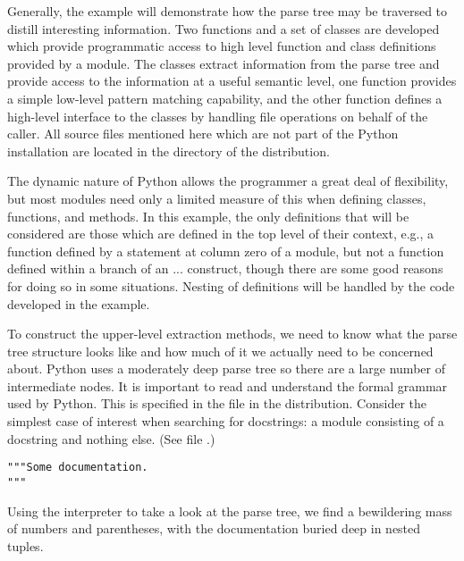 Generally, the example will demonstrate how the parse tree may be
traversed to distill interesting information.  Two functions and a set
of classes are developed which provide programmatic access to high
level function and class definitions provided by a module.  The
classes extract information from the parse tree and provide access to
the information at a useful semantic level, one function provides a
simple low-level pattern matching capability, and the other function
defines a high-level interface to the classes by handling file
operations on behalf of the caller.  All source files mentioned here
which are not part of the Python installation are located in the
 directory of the distribution.

The dynamic nature of Python allows the programmer a great deal of
flexibility, but most modules need only a limited measure of this when
defining classes, functions, and methods.  In this example, the only
definitions that will be considered are those which are defined in the
top level of their context, e.g., a function defined by a 
statement at column zero of a module, but not a function defined
within a branch of an  ...  construct, though
there are some good reasons for doing so in some situations.  Nesting
of definitions will be handled by the code developed in the example.

To construct the upper-level extraction methods, we need to know what
the parse tree structure looks like and how much of it we actually
need to be concerned about.  Python uses a moderately deep parse tree
so there are a large number of intermediate nodes.  It is important to
read and understand the formal grammar used by Python.  This is
specified in the file  in the distribution.
Consider the simplest case of interest when searching for docstrings:
a module consisting of a docstring and nothing else.  (See file
.)

\bcode\begin{verbatim}
"""Some documentation.
"""
\end{verbatim}\ecode
%
Using the interpreter to take a look at the parse tree, we find a
bewildering mass of numbers and parentheses, with the documentation
buried deep in nested tuples.

